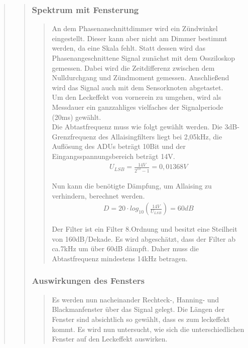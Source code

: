 \begin{quote}
\begin{quote}
		\subsubsection{Spektrum mit Fensterung}
		\begin{quote}
            An dem Phasenanschnittdimmer wird ein Zündwinkel eingestellt. Dieser kann aber nicht am Dimmer bestimmt
            werden, da eine Skala fehlt. Statt dessen wird das Phasenangeschnittene Signal zunächst mit dem Ossziloskop
            gemessen.
            Dabei wird die Zeitdifferenz zwischen dem Nulldurchgang und Zündmoment gemessen. Anschließend wird das
            Signal auch mit dem Sensorknoten abgetastet.\\
            Um den Leckeffekt von vornerein zu umgehen, wird als Messdauer ein ganzzahliges vielfaches der Signalperiode
            (20ms) gewählt.\\
            Die Abtastfrequenz muss wie folgt gewählt werden.
            Die 3dB-Grenzfrequenz des Allaisingfilters liegt bei 2,05kHz, die Auflösung des ADUs beträgt 10Bit und der
            Eingangsspannungsbereich beträgt 14V.\\
            
            \begin{align}
                U_{LSB} = \frac{14V}{2^{10}-1} = 0,01368V 
            \end{align} 
		
		    Nun kann die benötigte Dämpfung, um Allaising zu verhindern, berechnet werden.\\
		
            \begin{align}
                D = 20 \cdot log_{10}(\frac{14V}{U_{LSB}}) = 60dB
            \end{align} 
		
            Der Filter ist ein Filter 8.Ordnung und besitzt eine Steilheit von 160dB/Dekade. Es wird abgeschätzt, dass
            der Filter ab ca.7kHz um über 60dB dämpft. Daher muss die Abtastfrequenz mindestens 14kHz betragen.
		
		\end{quote}
		
		\subsubsection{Auswirkungen des Fensters}
		\begin{quote}
		  Es werden nun nacheinander Rechteck-, Hanning- und Blackmanfenster über das Signal gelegt. Die Längen der Fenster
		  sind absichtlich so gewählt, dass es zum leckeffekt kommt. Es wird nun untersucht, wie sich die unterschiedlichen
		  Fenster auf den Leckeffekt auswirken.		
		\end{quote}
		

\end{quote}
\end{quote}
